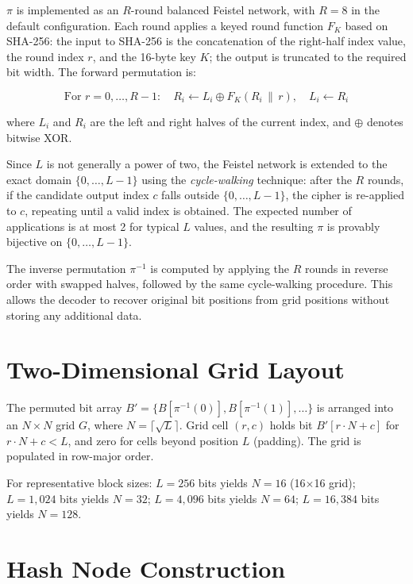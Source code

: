 $\pi$ is implemented as an $R$-round balanced Feistel network, with $R = 8$ in the default configuration. Each round applies a keyed round function $F_K$ based on SHA-256: the input to SHA-256 is the concatenation of the right-half index value, the round index $r$, and the 16-byte key $K$; the output is truncated to the required bit width. The forward permutation is:

\begin{equation}
    \text{For } r = 0, \ldots, R-1: \quad R_i \leftarrow L_i \oplus F_K(R_i \,\|\, r), \quad L_i \leftarrow R_i
\end{equation}

where $L_i$ and $R_i$ are the left and right halves of the current index, and $\oplus$ denotes bitwise XOR.

Since $L$ is not generally a power of two, the Feistel network is extended to the exact domain $\{0, \ldots, L-1\}$ using the \emph{cycle-walking} technique: after the $R$ rounds, if the candidate output index $c$ falls outside $\{0, \ldots, L-1\}$, the cipher is re-applied to $c$, repeating until a valid index is obtained. The expected number of applications is at most 2 for typical $L$ values, and the resulting $\pi$ is provably bijective on $\{0, \ldots, L-1\}$.

The inverse permutation $\pi^{-1}$ is computed by applying the $R$ rounds in reverse order with swapped halves, followed by the same cycle-walking procedure. This allows the decoder to recover original bit positions from grid positions without storing any additional data.

\section{Two-Dimensional Grid Layout}

The permuted bit array $B' = \{B[\pi^{-1}(0)], B[\pi^{-1}(1)], \ldots\}$ is arranged into an $N \times N$ grid $G$, where $N = \lceil\sqrt{L}\rceil$. Grid cell $(r, c)$ holds bit $B'[r \cdot N + c]$ for $r \cdot N + c < L$, and zero for cells beyond position $L$ (padding). The grid is populated in row-major order.

For representative block sizes: $L = 256$ bits yields $N = 16$ (16$\times$16 grid); $L = 1{,}024$ bits yields $N = 32$; $L = 4{,}096$ bits yields $N = 64$; $L = 16{,}384$ bits yields $N = 128$.

\section{Hash Node Construction}


